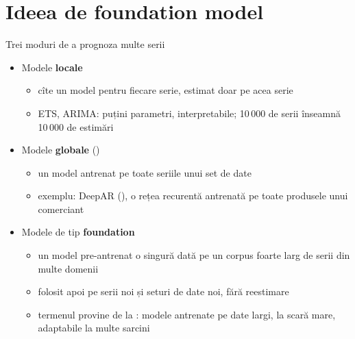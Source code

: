 \section{Ideea de foundation model}

\begin{frame}{Trei moduri de a prognoza multe serii}
\itemsize{\small}
\begin{itemize}
    \item Modele \textbf{locale}
    \begin{itemize}
        \item cîte un model pentru fiecare serie, estimat doar pe acea serie
        \item ETS, ARIMA: puțini parametri, interpretabile; 10\,000 de serii înseamnă 10\,000 de estimări
    \end{itemize}
    \item Modele \textbf{globale} ()
    \begin{itemize}
        \item un model antrenat pe toate seriile unui set de date
        \item exemplu: DeepAR (), o rețea recurentă antrenată pe toate produsele unui comerciant
    \end{itemize}
    \item Modele de tip \textbf{foundation}
    \begin{itemize}
        \item un model pre-antrenat o singură dată pe un corpus foarte larg de serii din multe domenii
        \item folosit apoi pe serii noi și seturi de date noi, fără reestimare
        \item termenul provine de la : modele antrenate pe date largi, la scară mare, adaptabile la multe sarcini
    \end{itemize}
\end{itemize}
\end{frame}

